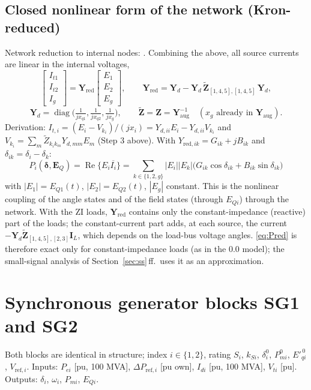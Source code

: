 \documentclass[11pt,a4paper]{article}
\numberwithin{equation}{section}
\newcommand{\cj}[1]{\overline{#1}}
\newcommand{\re}{\operatorname{Re}}
\newcommand{\blk}[1]{\textsf{#1}}
\begin{document}
\subsection{Closed nonlinear form of the network (Kron-reduced)}
Network reduction to internal nodes: \cite{BergenVittal2000,SauerPai1998}.
Combining the above, all source currents are linear in the internal voltages,
\begin{equation}
\begin{bmatrix} I_{t1}\\ I_{t2}\\ I_g\end{bmatrix}
= \bm Y_{\text{red}}\begin{bmatrix} E_1\\ E_2\\ E_g\end{bmatrix},\qquad
\bm Y_{\text{red}} = \bm Y_d - \bm Y_d\,\tilde{\bm Z}_{[1,4,5],[1,4,5]}\,\bm Y_d,
\end{equation}
\begin{equation}
\bm Y_d = \operatorname{diag}\!\Big(\tfrac{1}{jx_{q1}},\tfrac{1}{jx_{q2}},\tfrac{1}{jx_g}\Big),\qquad
\tilde{\bm Z} = \bm Z = \bm Y_{\text{aug}}^{-1}\quad(x_g\text{ already in }\bm Y_{\text{aug}}).
\end{equation}
Derivation: $I_{t,i} = (E_i - V_{k_i})/(jx_i) = Y_{d,ii}E_i - Y_{d,ii}V_{k_i}$ and $V_{k_i} = \sum_m \tilde Z_{k_i k_m} Y_{d,mm}E_m$ (Step 3 above).
With $Y_{\text{red},ik} = G_{ik}+jB_{ik}$ and $\delta_{ik}=\delta_i-\delta_k$:
\begin{equation}
\boxed{P_{i}(\bm\delta,\bm E_Q) = \re\{E_i\cj{I_i}\} = \sum_{k\in\{1,2,g\}} |E_i||E_k|\big(G_{ik}\cos\delta_{ik} + B_{ik}\sin\delta_{ik}\big)}
\label{eq:Pred}
\end{equation}
with $|E_1| = E_{Q1}(t)$, $|E_2| = E_{Q2}(t)$, $|E_g|$ constant. This is the nonlinear coupling of the angle states and of the field states (through $E_{Qi}$) through the network. With the ZI loads, $\bm Y_{\text{red}}$ contains only the constant-impedance (reactive) part of the loads; the constant-current part adds, at each source, the current $-\bm Y_d\tilde{\bm Z}_{[1,4,5],[2,3]}\bm I_L$, which depends on the load-bus voltage angles. \eqref{eq:Pred} is therefore exact only for constant-impedance loads (as in the 0.0 model); the small-signal analysis of Section~\ref{sec:ss}\,ff.\ uses it as an approximation.

\section{Synchronous generator blocks \blk{SG1} and \blk{SG2}}
Both blocks are identical in structure; index $i\in\{1,2\}$, rating $S_i$, $k_{Si}$, $\delta_i^0$, $P_{mi}^0$, $E'^{\,0}_{qi}$, $V_{\text{ref},i}$.
Inputs: $P_{ei}$ [pu, 100 MVA], $\Delta P_{\text{ref},i}$ [pu own], $I_{di}$ [pu, 100 MVA], $V_{ti}$ [pu]. Outputs: $\delta_i$, $\omega_i$, $P_{mi}$, $E_{Qi}$.
\end{document}
